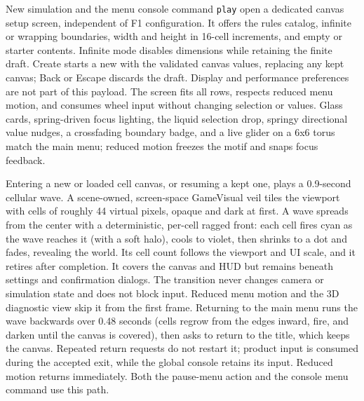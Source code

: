 New simulation and the menu console command \texttt{play} open a dedicated canvas
setup screen, independent of F1 configuration. It offers the rules catalog,
infinite or wrapping boundaries, width and height in 16-cell increments, and
empty or starter contents. Infinite mode disables dimensions while retaining
the finite draft. Create starts a new  with the
validated canvas values, replacing any kept canvas; Back or Escape discards the
draft. Display and performance preferences are not
part of this payload. The screen fits all rows, respects reduced menu motion,
and consumes wheel input without changing selection or values. Glass cards,
spring-driven focus lighting, the liquid selection drop, springy directional
value nudges, a crossfading boundary badge, and a live glider on a 6x6 torus match
the main menu; reduced motion freezes the motif and snaps focus feedback.

Entering a new or loaded cell canvas, or resuming a kept one, plays a
0.9-second cellular wave. A scene-owned, screen-space GameVisual veil tiles the
viewport with cells of
roughly 44 virtual pixels, opaque and dark at first. A wave spreads from the
center with a deterministic, per-cell ragged front: each cell fires cyan as the
wave reaches it (with a soft halo), cools to violet, then shrinks to a dot and
fades, revealing the world. Its cell count follows the viewport and UI scale,
and it retires after completion. It covers the canvas and HUD but remains beneath
settings and confirmation dialogs. The transition never changes camera or
simulation state and does not block input. Reduced menu motion and the 3D
diagnostic view skip it from the first frame. Returning to the main menu runs
the wave backwards over 0.48 seconds (cells regrow from the edges inward, fire,
and darken until the canvas is covered), then asks  to
return to the title, which keeps the canvas. Repeated return
requests do not restart it; product input is consumed during the accepted exit,
while the global console retains its input. Reduced motion returns immediately.
Both the pause-menu action and the console menu command use this path.

